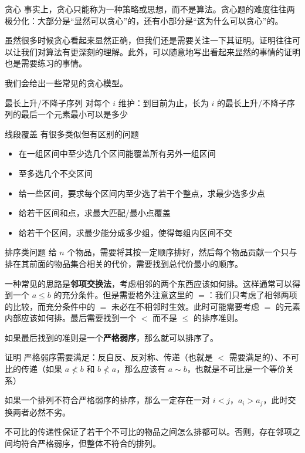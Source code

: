\documentclass[11pt,aspectratio=169]{beamer}
\begin{document}
\begin{frame}{贪心}
    事实上，贪心只能称为一种策略或思想，而不是算法。贪心题的难度往往两极分化：大部分是“显然可以贪心”的，还有小部分是“这为什么可以贪心”的。

    虽然很多时候贪心看起来显然正确，但我们还是需要关注一下其证明。证明往往可以让我们对算法有更深刻的理解。此外，可以随意地写出看起来显然的事情的证明也是需要练习的事情。

    我们会给出一些常见的贪心模型。
\end{frame}
\begin{frame}{最长上升/不降子序列}
    对每个 $i$ 维护：到目前为止，长为 $i$ 的最长上升/不降子序列的最后一个元素最小可以是多少
\end{frame}
\begin{frame}{线段覆盖}
    有很多类似但有区别的问题
    \begin{itemize}
        \item 在一组区间中至少选几个区间能覆盖所有另外一组区间
        \item 至多选几个不交区间
        \item 给一些区间，要求每个区间内至少选了若干个整点，求最少选多少点
        \item 给若干区间和点，求最大匹配/最小点覆盖
        \item 给若干个区间，求最少能分成多少组，使得每组内区间不交
    \end{itemize}
\end{frame}
\begin{frame}{排序类问题}
    给 $n$ 个物品，需要将其按一定顺序排好，然后每个物品贡献一个只与排在其前面的物品集合相关的代价，需要找到总代价最小的顺序。

    一种常见的思路是\textbf{邻项交换法}，考虑相邻的两个东西应该如何排。这样通常可以得到一个 $a\le b$ 的充分条件。但是需要格外注意这里的 $=$：我们只考虑了相邻两项的比较，而充分条件中的 $=$ 未必在不相邻时生效。此时可能需要考虑 $=$ 的元素内部应该如何排。最后需要找到一个 $<$ 而不是 $\le$ 的排序准则。
    
    如果最后找到的准则是一个\textbf{严格弱序}，那么就可以排序了。
\end{frame}
\begin{frame}{证明}
    严格弱序需要满足：反自反、反对称、传递（也就是 $<$ 需要满足的）、不可比的传递（如果 $a\not < b$ 和 $b\not <a$，那么应该有 $a\sim b$，也就是不可比是一个等价关系）

    如果一个排列不符合严格弱序的排序，那么一定存在一对 $i<j$，$a_i>a_{j}$，此时交换两者必然不劣。

    不可比的传递性保证了若干个不可比的物品之间怎么排都可以。否则，存在邻项之间均符合严格弱序，但整体不符合的排列。
\end{frame}
\end{document}
